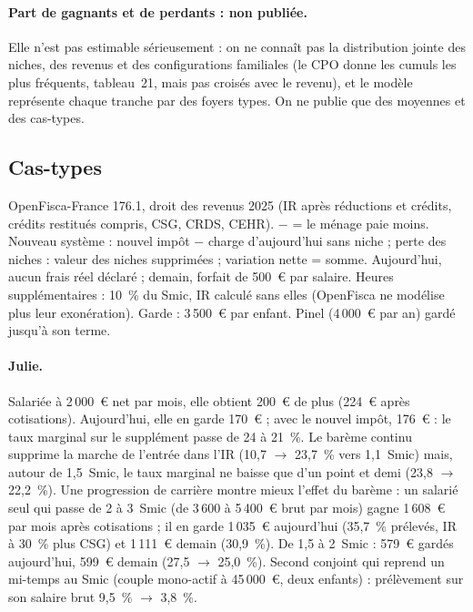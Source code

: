 \paragraph{Part de gagnants et de perdants : non publiée.} Elle n'est pas estimable sérieusement : on ne connaît pas la distribution jointe des niches, des revenus et des configurations familiales (le CPO donne les cumuls les plus fréquents, tableau~21, mais pas croisés avec le revenu), et le modèle représente chaque tranche par des foyers types. On ne publie que des moyennes et des cas-types.

\subsection{Cas-types}

\begin{table}[h]\centering\scriptsize\setlength{\tabcolsep}{3pt}
\caption{Cas-types : ce que la réforme change, niches comprises}\label{tab:ircsg4_cas}

\par\smallskip\begin{minipage}{0.95\linewidth}\footnotesize OpenFisca-France 176.1, droit des revenus 2025 (IR après réductions et crédits, crédits restitués compris, CSG, CRDS, CEHR). $-$ = le ménage paie moins. Nouveau système : nouvel impôt $-$ charge d'aujourd'hui sans niche ; perte des niches : valeur des niches supprimées ; variation nette = somme. Aujourd'hui, aucun frais réel déclaré ; demain, forfait de 500~€ par salaire. Heures supplémentaires : 10~\% du Smic, IR calculé sans elles (OpenFisca ne modélise plus leur exonération). Garde : 3\,500~€ par enfant. Pinel (4\,000~€ par an) gardé jusqu'à son terme.\end{minipage}
\end{table}

\paragraph{Julie.} Salariée à 2\,000~€ net par mois, elle obtient 200~€ de plus (224~€ après cotisations). Aujourd'hui, elle en garde 170~€ ; avec le nouvel impôt, 176~€ : le taux marginal sur le supplément passe de 24 à 21~\%. Le barème continu supprime la marche de l'entrée dans l'IR (10,7 $\to$ 23,7~\% vers 1,1~Smic) mais, autour de 1,5~Smic, le taux marginal ne baisse que d'un point et demi (23,8 $\to$ 22,2~\%). Une progression de carrière montre mieux l'effet du barème : un salarié seul qui passe de 2 à 3~Smic (de 3\,600 à 5\,400~€ brut par mois) gagne 1\,608~€ par mois après cotisations ; il en garde 1\,035~€ aujourd'hui (35,7~\% prélevés, IR à 30~\% plus CSG) et 1\,111~€ demain (30,9~\%). De 1,5 à 2~Smic : 579~€ gardés aujourd'hui, 599~€ demain (27,5 $\to$ 25,0~\%). Second conjoint qui reprend un mi-temps au Smic (couple mono-actif à 45\,000~€, deux enfants) : prélèvement sur son salaire brut 9,5~\% $\to$ 3,8~\%.

